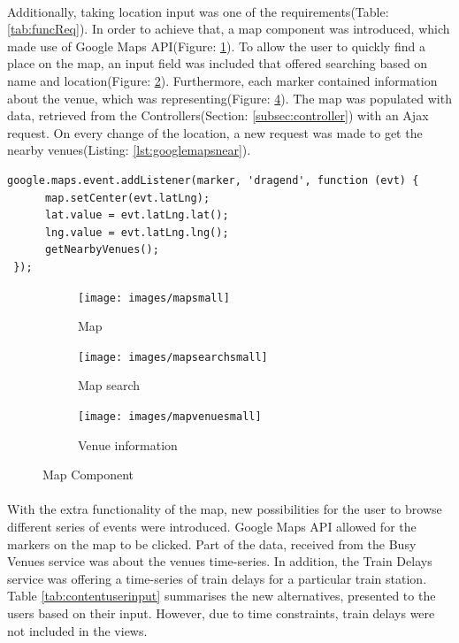 \documentclass{l4proj}
\begin{document}
\paragraph{}
Additionally, taking location input was one of the requirements(Table: \ref{tab:funcReq}). In order to achieve that, a map component was introduced, which made use of Google Maps API(Figure: \ref{mapsmall}). To allow the user to quickly find a place on the map, an input field was included that offered searching based on name and location(Figure: \ref{mapsearchsmall}). Furthermore, each marker contained information about the venue, which was representing(Figure: \ref{mapvenuessmall}). The map was populated with data, retrieved from the Controllers(Section: \ref{subsec:controller}) with an Ajax request. On every change of the location, a new request was made to get the nearby venues(Listing: \ref{lst:googlemapsnear}).

\begin{lstlisting}[caption={Getting nearby venues},label={lst:googlemapsnear}]
 google.maps.event.addListener(marker, 'dragend', function (evt) {
	  map.setCenter(evt.latLng);
	  lat.value = evt.latLng.lat();
	  lng.value = evt.latLng.lng();
	  getNearbyVenues();
 });
\end{lstlisting}

\begin{figure}[H]
	\centering
	\begin{subfigure}{.3\textwidth}
		\texttt{[image: images/mapsmall]}
		\caption{Map}
		\label{mapsmall}
	\end{subfigure}
	\begin{subfigure}{.3\textwidth}
		\texttt{[image: images/mapsearchsmall]}
		\caption{Map search}
		\label{mapsearchsmall}
	\end{subfigure}
	\begin{subfigure}{.3\textwidth}
		\texttt{[image: images/mapvenuesmall]}
		\caption{Venue information}
		\label{mapvenuessmall}
	\end{subfigure}
	\caption{Map Component}
\end{figure}

\paragraph{}
With the extra functionality of the map, new possibilities for the user to browse different series of events were introduced. Google Maps API allowed for the markers on the map to be clicked. Part of the data, received from the Busy Venues service was about the venue\textquotesingle s time-series. In addition, the Train Delays service was offering a time-series of train delays for a particular train station. Table \ref{tab:contentuserinput} summarises the new alternatives, presented to the users based on their input. However, due to time constraints, train delays were not included in the views. 
\end{document}
